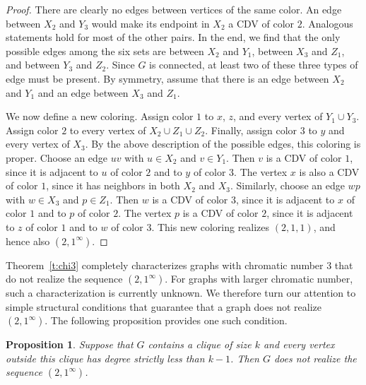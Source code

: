 \documentclass{article}
\newtheorem{proposition}[theorem]{Proposition}
\theoremstyle{definition}
\begin{document}
\begin{proof}
There are clearly no edges between vertices of the same color. 
An edge between $X_2$ and $Y_3$ would make its endpoint in $X_2$ a CDV of color $2$.
Analogous statements hold for most of the other pairs.
In the end, we find that the only possible edges among the six sets are between $X_2$ and $Y_1$, between $X_3$ and $Z_1$, and between $Y_3$ and $Z_2$. 
Since $G$ is connected, at least two of these three types of edge must be present.
By symmetry, assume that there is an edge between $X_2$ and $Y_1$ and an edge between $X_3$ and $Z_1$.

We now define a new coloring. Assign color $1$ to $x$, $z$, and every vertex of $Y_1\cup Y_3$. Assign color $2$ to every vertex of $X_2\cup Z_1\cup Z_2$. Finally, assign color $3$ to $y$ and every vertex of $X_3$. By the above description of the possible edges, this coloring is proper. Choose an edge $uv$ with $u\in X_2$ and $v\in Y_1$. Then $v$ is a CDV of color $1$, since it is adjacent to $u$ of color $2$ and to $y$ of color $3$. The vertex $x$ is also a CDV of color $1$, since it has neighbors in both $X_2$ and $X_3$. Similarly, choose an edge $wp$ with $w\in X_3$ and $p\in Z_1$. Then $w$ is a CDV of color $3$, since it is adjacent to $x$ of color $1$ and to $p$ of color $2$. The vertex $p$ is a CDV of color $2$, since it is adjacent to $z$ of color $1$ and to $w$ of color $3$. This new coloring realizes $(2,1,1)$, and hence also $(2,1^\infty)$.
\end{proof}

\medskip

Theorem~\ref{t:chi3} completely characterizes graphs with chromatic number $3$ that do not realize the sequence $(2,1^\infty)$. For graphs with larger chromatic number, such a characterization is currently unknown.
We therefore turn our attention to simple structural conditions that guarantee that a graph does not realize $(2,1^\infty)$. The following proposition provides one such condition.

\begin{proposition}\label{p:no21}
Suppose that $G$ contains a clique of size $k$ and every vertex outside this clique has degree strictly less than $k-1$. Then $G$ does not realize the sequence $(2,1^\infty)$.
\end{proposition}
\end{document}
